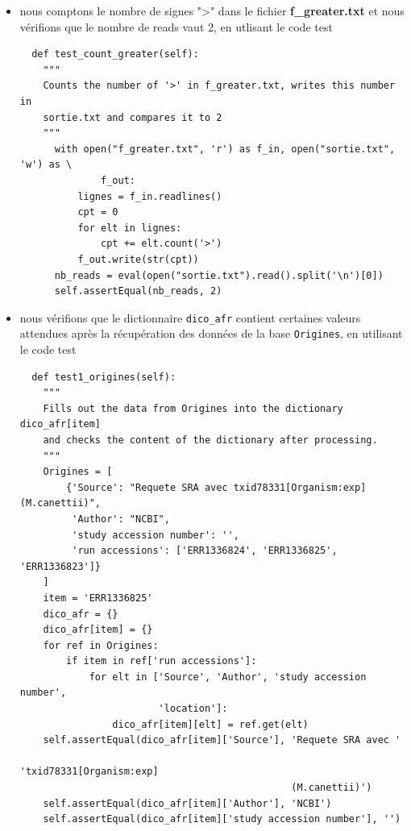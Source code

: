 \documentclass[twoside,a4paper,11pt,frenchb,openany]{report}
\begin{document}
\begin{itemize}
\begin{verbatim}
  def test_concat(self):
    """
    Applies concat() to the tests files f1.txt and f2.txt and checks the
    content of f_shuffled.txt after processing.
    """
    concat("f1.txt", "f2.txt", "f_shuffled.txt")
    with open("f_shuffled.txt", 'r') as f:
        lignes = f.readlines()
    self.assertEqual(['ligne 1\n', 'ligne 2\n', 'ligne 3\n', 'ligne 4\n'],
                      lignes)
\end{verbatim}
\item nous comptons le nombre de signes ">" dans le fichier \textbf{f\_greater.txt} et nous vérifions que le nombre de reads vaut 2, en utlisant le code test
\begin{verbatim}
  def test_count_greater(self):
    """
    Counts the number of '>' in f_greater.txt, writes this number in
    sortie.txt and compares it to 2
    """
      with open("f_greater.txt", 'r') as f_in, open("sortie.txt", 'w') as \
              f_out:
          lignes = f_in.readlines()
          cpt = 0
          for elt in lignes:
              cpt += elt.count('>')
          f_out.write(str(cpt))
      nb_reads = eval(open("sortie.txt").read().split('\n')[0])
      self.assertEqual(nb_reads, 2)
\end{verbatim}
\item nous vérifions que le dictionnaire \texttt{dico\_afr} contient certaines valeurs attendues après la récupération des données de la base \texttt{Origines}, en utilisant le code test
\begin{verbatim}
  def test1_origines(self):
    """
    Fills out the data from Origines into the dictionary dico_afr[item]
    and checks the content of the dictionary after processing.
    """
    Origines = [
        {'Source': "Requete SRA avec txid78331[Organism:exp]  (M.canettii)",
         'Author': "NCBI",
         'study accession number': '',
         'run accessions': ['ERR1336824', 'ERR1336825', 'ERR1336823']}
    ]
    item = 'ERR1336825'
    dico_afr = {}
    dico_afr[item] = {}
    for ref in Origines:
        if item in ref['run accessions']:
            for elt in ['Source', 'Author', 'study accession number',
                        'location']:
                dico_afr[item][elt] = ref.get(elt)
    self.assertEqual(dico_afr[item]['Source'], 'Requete SRA avec '
                                               'txid78331[Organism:exp] 
                                               (M.canettii)')
    self.assertEqual(dico_afr[item]['Author'], 'NCBI')
    self.assertEqual(dico_afr[item]['study accession number'], '')

\end{verbatim}
\end{itemize}
\end{document}
